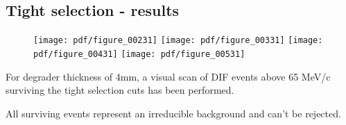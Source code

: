 \subsection{Tight selection - results}


\begin{figure}[H]
  \texttt{[image: pdf/figure\_00231]}
  \texttt{[image: pdf/figure\_00331]}
  \texttt{[image: pdf/figure\_00431]}
  \texttt{[image: pdf/figure\_00531]}
  \caption{
    \label{fig:deg_3mm_mom}
  }
\end{figure}

For degrader thickness of 4mm, a visual scan of DIF events above 65 MeV/c surviving
the tight selection cuts has been performed.

All surviving events represent an irreducible background and can't be rejected.

